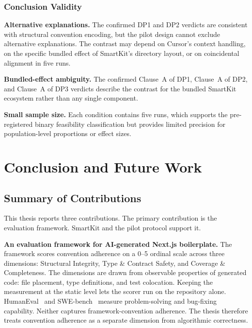 \documentclass[12pt,a4paper]{report}
\begin{document}
\subsection{Conclusion Validity}
\label{sec:conclusion-validity}

\textbf{Alternative explanations.} The confirmed DP1 and DP2 verdicts are consistent with structural convention encoding, but the pilot design cannot exclude alternative explanations. The contrast may depend on Cursor's context handling, on the specific bundled effect of SmartKit's directory layout, or on coincidental alignment in five runs.

\textbf{Bundled-effect ambiguity.} The confirmed Clause~A of DP1, Clause~A of DP2, and Clause~A of DP3 verdicts describe the contrast for the bundled SmartKit ecosystem rather than any single component.

\textbf{Small sample size.} Each condition contains five runs, which supports the pre-registered binary feasibility classification but provides limited precision for population-level proportions or effect sizes.

\chapter{Conclusion and Future Work}
\label{sec:conclusion}

\section{Summary of Contributions}
\label{sec:summary-contributions}

This thesis reports three contributions. The primary contribution is the evaluation framework. SmartKit and the pilot protocol support it.

\textbf{An evaluation framework for AI-generated Next.js boilerplate.} The framework scores convention adherence on a 0--5 ordinal scale across three dimensions: Structural Integrity, Type \& Contract Safety, and Coverage \& Completeness. The dimensions are drawn from observable properties of generated code: file placement, type definitions, and test colocation. Keeping the measurement at the static level lets the scorer run on the repository alone. HumanEval~\parencite{chen2021evaluating} and SWE-bench~\parencite{jimenez2024swebench} measure problem-solving and bug-fixing capability. Neither captures framework-convention adherence. The thesis therefore treats convention adherence as a separate dimension from algorithmic correctness.
\end{document}
